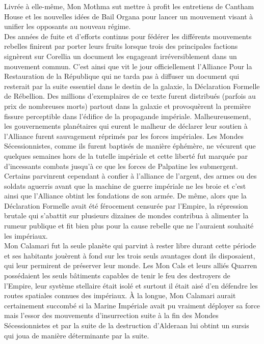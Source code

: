 \documentclass[twoside]{article}
\begin{document}
Livrée à elle-même, Mon Mothma sut mettre à profit les entretiens de Cantham House et les nouvelles idées de Bail Organa pour lancer un mouvement visant à unifier les opposants au nouveau régime.\\

Des années de fuite et d'efforts continus pour fédérer les différents mouvements rebelles finirent par porter leurs fruits lorsque trois des principales factions signèrent sur Corellia un document les engageant irréversiblement dans un mouvement commun. C'est ainsi que vit le jour officiellement l'Alliance Pour la Restauration de la République qui ne tarda pas à diffuser un document qui resterait par la suite essentiel dans le destin de la galaxie, la Déclaration Formelle de Rébellion.
Des millions d'exemplaires de ce texte furent distribués (parfois au prix de nombreuses morts) partout dans la galaxie et provoquèrent la première fissure perceptible dans l'édifice de la propagande impériale. Malheureusement, les gouvernements planétaires qui eurent le malheur de déclarer leur soutien à l'Alliance furent sauvagement réprimés par les forces impériales. Les Mondes Sécessionnistes, comme ils furent baptisés de manière éphémère, ne vécurent que quelques semaines hors de la tutelle impériale et cette liberté fut marquée par d'incessants combats jusqu'à ce que les forces de Palpatine les submergent.
Certains parvinrent cependant à confier à l'alliance de l'argent, des armes ou des soldats aguerris avant que la machine de guerre impériale ne les broie et c'est ainsi que l'Alliance obtint les fondations de son armée. De même, alors que la Déclaration Formelle avait été férocement censurée par l'Empire, la répression brutale qui s'abattit sur plusieurs dizaines de mondes contribua à alimenter la rumeur publique et fit bien plus pour la cause rebelle que ne l'auraient souhaité les impériaux.\\

Mon Calamari fut la seule planète qui parvint à rester libre durant cette période et ses habitants jouèrent à fond sur les trois seuls avantages dont ils disposaient, qui leur permirent de préserver leur monde. Les Mon Cals et leurs alliés Quarren possédaient les seuls bâtiments capables de tenir le feu des destroyers de l'Empire, leur système stellaire était isolé et surtout il était aisé d'en défendre les routes spatiales connues des impériaux. À la longue, Mon Calamari aurait certainement succombé si la Marine Impériale avait pu vraiment déployer sa force mais l'essor des mouvements d'insurrection suite à la fin des Mondes Sécessionnistes et par la suite de la destruction d'Alderaan lui obtint un sursis qui joua de manière déterminante par la suite.
\end{document}
